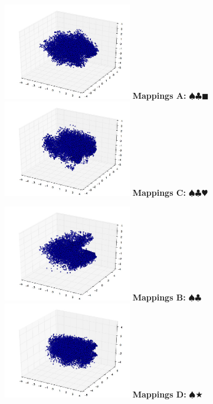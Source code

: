 \begin{itemize}
\begin{figure}[h]
  \centering
  \begin{multicols}{2}
    \includegraphics[width=0.5\textwidth]{../img/mappings_get10000_occ100_cos.jpg}
    \textbf{Mappings A:} $\spadesuit\clubsuit\blacksquare$
    \includegraphics[width=0.5\textwidth]{../img/mappings_get10000_occ100_eucl.jpg}
    \textbf{Mappings C:} $\spadesuit\clubsuit\varheart$

    \columnbreak

    \includegraphics[width=0.5\textwidth]{../img/mappings_get10000_occ100.jpg}
    \textbf{Mappings B:} $\spadesuit\clubsuit$
    \includegraphics[width=0.5\textwidth]{../img/mappings10000_occ.jpg}
    \textbf{Mappings D:} $\spadesuit\bigstar$
  \end{multicols}


\end{figure}
\end{itemize}
